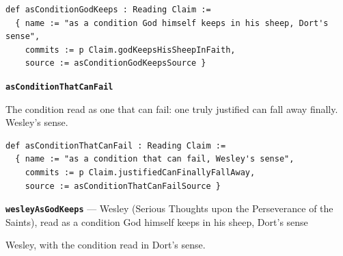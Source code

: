 \documentclass[11pt]{article}
\begin{document}
{\small\begin{verbatim}
def asConditionGodKeeps : Reading Claim :=
  { name := "as a condition God himself keeps in his sheep, Dort's sense",
    commits := p Claim.godKeepsHisSheepInFaith,
    source := asConditionGodKeepsSource }
\end{verbatim}}
\par\medskip\noindent\textbf{\texttt{as\allowbreak{}Condition\allowbreak{}That\allowbreak{}Can\allowbreak{}Fail}}\par\nobreak\noindent
The condition read as one that can fail: one truly justified can fall away finally. Wesley’s sense.

{\small\begin{verbatim}
def asConditionThatCanFail : Reading Claim :=
  { name := "as a condition that can fail, Wesley's sense",
    commits := p Claim.justifiedCanFinallyFallAway,
    source := asConditionThatCanFailSource }
\end{verbatim}}
\par\medskip\noindent\textbf{\texttt{wesley\allowbreak{}As\allowbreak{}God\allowbreak{}Keeps}} --- Wesley (Serious Thoughts upon the Perseverance of the Saints), read as a condition God himself keeps in his sheep, Dort’s sense\par\nobreak\noindent
Wesley, with the condition read in Dort’s sense.
\end{document}
